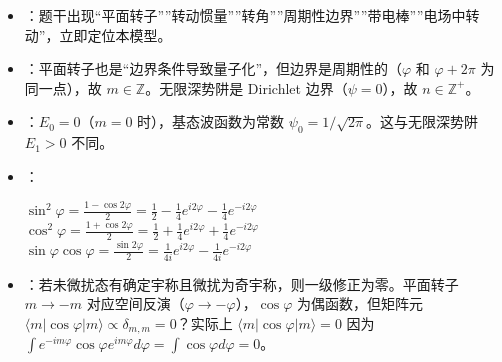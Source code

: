 \begin{tipbox}[快速识别与解题技巧]
\begin{itemize}
    \item {}：题干出现``平面转子''''转动惯量''''转角''''周期性边界''''带电棒''''电场中转动''，立即定位本模型。
    \item {}：平面转子也是``边界条件导致量子化''，但边界是周期性的（$\varphi$ 和 $\varphi+2\pi$ 为同一点），故 $m\in\mathbb{Z}$。无限深势阱是 Dirichlet 边界（$\psi=0$），故 $n\in\mathbb{Z}^+$。
    \item {}：$E_0=0$（$m=0$ 时），基态波函数为常数 $\psi_0=1/\sqrt{2\pi}$。这与无限深势阱 $E_1>0$ 不同。
    \item {}：
    \begin{center}
    $\sin^2\varphi=\frac{1-\cos2\varphi}{2}=\frac12-\frac14e^{i2\varphi}-\frac14e^{-i2\varphi}$\\[2pt]
    $\cos^2\varphi=\frac{1+\cos2\varphi}{2}=\frac12+\frac14e^{i2\varphi}+\frac14e^{-i2\varphi}$\\[2pt]
    $\sin\varphi\cos\varphi=\frac{\sin2\varphi}{2}=\frac{1}{4i}e^{i2\varphi}-\frac{1}{4i}e^{-i2\varphi}$
    \end{center}
    \item {}：若未微扰态有确定宇称且微扰为奇宇称，则一级修正为零。平面转子 $m\to-m$ 对应空间反演（$\varphi\to-\varphi$），$\cos\varphi$ 为偶函数，但矩阵元 $\langle m|\cos\varphi|m\rangle\propto\delta_{m,m}=0$？实际上 $\langle m|\cos\varphi|m\rangle=0$ 因为 $\int e^{-im\varphi}\cos\varphi e^{im\varphi}d\varphi=\int\cos\varphi d\varphi=0$。
\end{itemize}
\end{tipbox}

